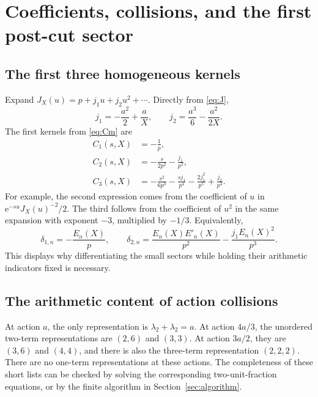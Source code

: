 \documentclass[11pt,a4paper]{article}
\numberwithin{equation}{section}
\theoremstyle{definition}
\theoremstyle{remark}
\newcommand{\ee}{\mathrm e}
\begin{document}
\section{Coefficients, collisions, and the first post-cut sector}
\label{sec:firstcut}

\subsection{The first three homogeneous kernels}

Expand $J_X(u)=p+j_1u+j_2u^2+\cdots$. Directly from
\eqref{eq:J},
\begin{equation}
 j_1=-\frac{a^2}2+\frac aX,
 \qquad j_2=\frac{a^3}6-\frac{a^2}{2X}.
 \label{eq:js}
\end{equation}
The first kernels from \eqref{eq:Cm} are
\begin{align}
 C_1(s,X)&=-\frac1p,\label{eq:Cfirst}\\
 C_2(s,X)&=-\frac{s}{2p^2}-\frac{j_1}{p^3},\label{eq:Csecond}\\
 C_3(s,X)&=-\frac{s^2}{6p^3}-\frac{s j_1}{p^4}
          -\frac{2j_1^2}{p^5}+\frac{j_2}{p^4}.
 \label{eq:Cthird}
\end{align}
For example, the second expression comes from the coefficient of $u$
in $\ee^{-su}J_X(u)^{-2}/2$. The third follows from the coefficient
of $u^2$ in the same expansion with exponent $-3$, multiplied by
$-1/3$. Equivalently,
\begin{equation}
 \delta_{1,n}=-\frac{E_n(X)}p,
 \qquad
 \delta_{2,n}=\frac{E_n(X)E'_n(X)}{p^2}
              -\frac{j_1E_n(X)^2}{p^3}.
 \label{eq:deltatwo}
\end{equation}
This displays why differentiating the small sectors while holding their
arithmetic indicators fixed is necessary.

\subsection{The arithmetic content of action collisions}

At action $a$, the only representation is
$\lambda_2+\lambda_2=a$. At action $4a/3$, the unordered two-term
representations are $(2,6)$ and $(3,3)$. At action $3a/2$, they are
$(3,6)$ and $(4,4)$, and there is also the three-term representation
$(2,2,2)$. There are no one-term representations at these actions.
The completeness of these short lists can be checked by solving the
corresponding two-unit-fraction equations, or by the finite algorithm in
Section~\ref{sec:algorithm}.
\end{document}
